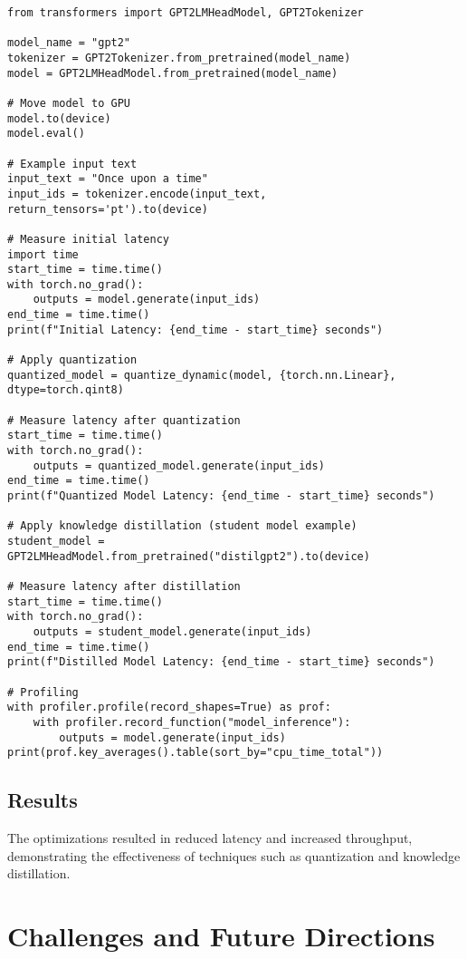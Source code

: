\begin{verbatim}
from transformers import GPT2LMHeadModel, GPT2Tokenizer

model_name = "gpt2"
tokenizer = GPT2Tokenizer.from_pretrained(model_name)
model = GPT2LMHeadModel.from_pretrained(model_name)

# Move model to GPU
model.to(device)
model.eval()

# Example input text
input_text = "Once upon a time"
input_ids = tokenizer.encode(input_text, return_tensors='pt').to(device)

# Measure initial latency
import time
start_time = time.time()
with torch.no_grad():
    outputs = model.generate(input_ids)
end_time = time.time()
print(f"Initial Latency: {end_time - start_time} seconds")

# Apply quantization
quantized_model = quantize_dynamic(model, {torch.nn.Linear}, dtype=torch.qint8)

# Measure latency after quantization
start_time = time.time()
with torch.no_grad():
    outputs = quantized_model.generate(input_ids)
end_time = time.time()
print(f"Quantized Model Latency: {end_time - start_time} seconds")

# Apply knowledge distillation (student model example)
student_model = GPT2LMHeadModel.from_pretrained("distilgpt2").to(device)

# Measure latency after distillation
start_time = time.time()
with torch.no_grad():
    outputs = student_model.generate(input_ids)
end_time = time.time()
print(f"Distilled Model Latency: {end_time - start_time} seconds")

# Profiling
with profiler.profile(record_shapes=True) as prof:
    with profiler.record_function("model_inference"):
        outputs = model.generate(input_ids)
print(prof.key_averages().table(sort_by="cpu_time_total"))
\end{verbatim}

\subsection{Results}
The optimizations resulted in reduced latency and increased throughput, demonstrating the effectiveness of techniques such as quantization and knowledge distillation.

\section{Challenges and Future Directions}

